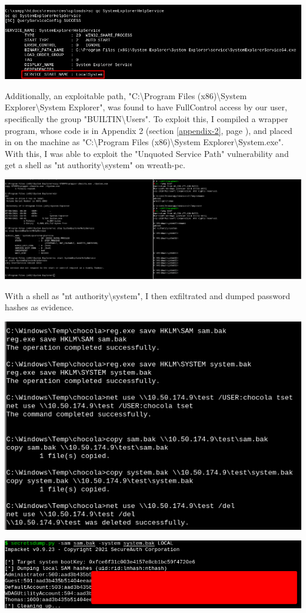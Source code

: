 \includegraphics[width=\textwidth]{img/service_as_admin.png}

Additionally, an exploitable path, "C:\textbackslash Program Files (x86)\textbackslash System Explorer\textbackslash System Explorer", was found to have FullControl access by our user, specifically the group "BUILTIN\textbackslash Users". To exploit this, I compiled a wrapper program, whose code is in Appendix 2 (section \ref{appendix-2}, page \pageref{appendix-2}), and placed in on the machine as "C:\textbackslash Program Files (x86)\textbackslash System Explorer\textbackslash System.exe". With this, I was able to exploit the "Unquoted Service Path" vulnerability and get a shell as "nt authority\textbackslash system" on wreath-pc.

\includegraphics[width=\textwidth]{img/pc-system-shell.png}

With a shell as "nt authority\textbackslash system", I then exfiltrated and dumped password hashes as evidence.

\includegraphics[width=\textwidth]{img/sam_dump.png}

\includegraphics[width=\textwidth]{img/secretsdump.png}
